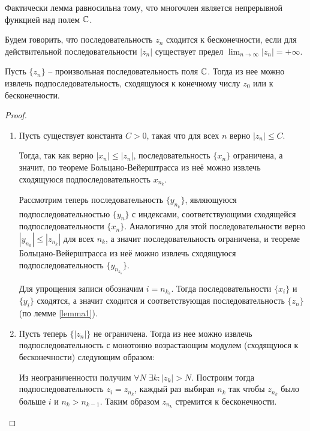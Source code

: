 \begin{note}
    Фактически лемма равносильна тому, что многочлен является непрерывной функцией над полем $\mathbb{C}$.
\end{note}

\begin{definition}
    Будем говорить, что последовательность $z_n$ сходится к бесконечности, если для действительной 
    последовательности $|z_n|$ существует предел $\displaystyle\lim_{n\to \infty} {|z_n|} = +\infty$.
\end{definition}

\begin{lemma}
    \label{lemma4}
    Пусть $\{ z_n \}$ -- произвольная последовательность поля $\mathbb{C}$. Тогда из нее можно извлечь подпоследовательность,
    сходящуюся к конечному числу $z_0$ или к бесконечности.
\end{lemma}

\begin{proof}~
    \begin{enumerate}
        \item Пусть существует константа $C > 0$, такая что для всех $n$ верно $|z_n| \leq C$. 
        
        Тогда, так как верно $|x_n| \leq |z_n|$, последовательность $\{ x_n \}$ ограничена,
        а значит, по теореме Больцано-Вейерштрасса из неё можно извлечь сходящуюся подпоследовательность $x_{n_k}$.
        
        Рассмотрим теперь последовательность $\{y_{n_k}\}$, являющуюся подпоследовательностью $\{y_n\}$ с индексами, 
        соответствующими сходящейся подпоследовательности $\{x_n\}$.
        Аналогично для этой последовательности верно $|y_{n_k}| \leq |z_{n_k}|$ для всех $n_k$, 
        а значит последовательность ограничена, и теореме Больцано-Вейерштрасса из 
        неё можно извлечь сходящуюся подпоследовательность $\{y_{n_{k_s}}\}$. 
        
        Для упрощения записи обозначим $i = n_{k_s}$.
        Тогда последовательности $\{x_i\}$ и $\{y_i\}$ сходятся, а значит сходится и 
        соответствующая последовательность $\{ z_n \}$ (по лемме \ref{lemma1}).
        
        \item 
        Пусть теперь $\{ |z_n| \}$ не ограничена. Тогда из нее можно извлечь подпоследовательность с 
        монотонно возрастающим модулем (сходящуюся к бесконечности) следующим образом:
        
        Из неограниченности получим $\forall N \; \exists k: |z_k| > N$. Построим тогда подпоследовательность $z_i = z_{n_k}$,
        каждый раз выбирая $n_k$ так чтобы $z_{n_k}$ было больше $i$ и $n_k > n_{k-1}$. Таким образом $z_{n_k}$ стремится к бесконечности.
    \end{enumerate}
\end{proof}

